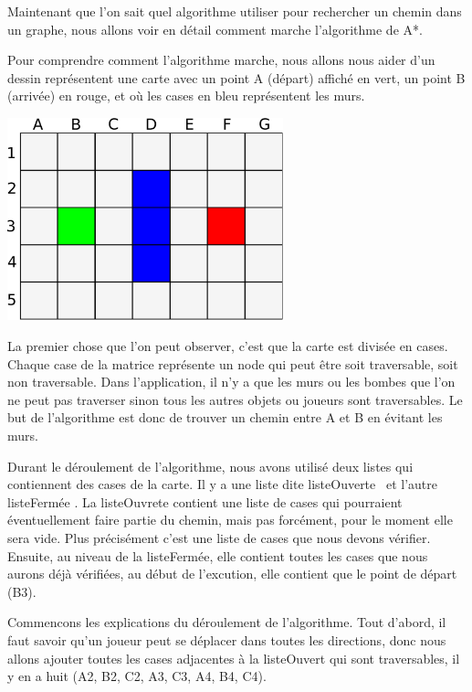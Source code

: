 			Maintenant que l'on sait quel algorithme utiliser pour rechercher un chemin dans un graphe, nous allons voir en détail comment marche l'algorithme de A*.
		
			Pour comprendre comment l'algorithme marche, nous allons nous aider d'un
			dessin représentent une carte avec un point A (départ) affiché en vert, un
			point B (arrivée) en rouge, et où les cases en bleu représentent les murs.
		
			\begin{center}
				\includegraphics[width=8cm]{./Analyse/Img/Grille.eps}
			\end{center}
		
			La premier chose que l'on peut observer, c'est que la carte est divisée en
			cases. Chaque case de la matrice représente un node qui peut être soit
			traversable, soit non traversable. Dans l'application, il n'y a que les murs
			ou les bombes que l'on ne peut pas traverser sinon tous les autres objets
			ou joueurs sont traversables. Le but de l'algorithme est donc de
			trouver un chemin entre A et B en évitant les murs.
			
		
			Durant le déroulement de l'algorithme, nous avons utilisé deux listes qui contiennent des cases de la carte.
			Il y a une liste dite \og listeOuverte \fg \, et l'autre \og listeFermée \fg.
			La listeOuvrete contient une liste de cases qui pourraient éventuellement faire partie du chemin, mais pas forcément, pour le moment elle sera vide.
			Plus précisément c'est une liste de cases que nous devons vérifier.
			Ensuite, au niveau de la listeFermée, elle contient toutes les cases que nous
			aurons déjà vérifiées, au début de l'excution, elle contient que le point de départ (B3).
			
		
			Commencons les explications du déroulement de l'algorithme.
			Tout d'abord, il faut savoir qu'un joueur peut se déplacer dans toutes les
			directions, donc nous allons ajouter toutes les cases adjacentes à la
			listeOuvert qui sont traversables, il y en a huit (A2, B2, C2, A3, C3, A4, B4, C4).
			
